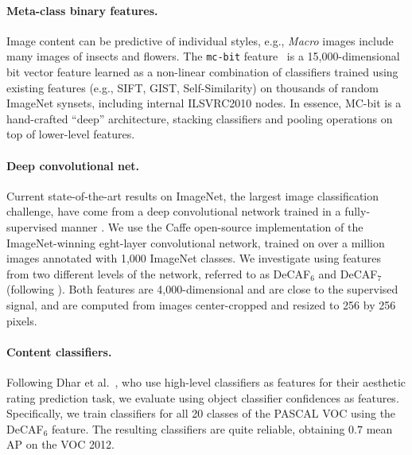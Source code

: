\vspace{-0.5em}
\paragraph{Meta-class binary features.}
Image content can be predictive of individual styles, e.g., \emph{Macro} images include many images of insects and flowers. The \texttt{mc-bit} feature~\cite{Bergamo-CVPR-2012} is a 15,000-dimensional bit vector feature learned as a non-linear combination of classifiers trained using existing features (e.g., SIFT, GIST, Self-Similarity) on thousands of random ImageNet synsets, including internal ILSVRC2010 nodes.
In essence, MC-bit is a hand-crafted ``deep'' architecture, stacking classifiers and pooling operations on top of lower-level features.

\vspace{-0.5em}
\paragraph{Deep convolutional net.}
Current state-of-the-art results on ImageNet, the largest image classification challenge, have come from a deep convolutional network trained in a fully-supervised manner \cite{krizhevsky2012imagenet}.
We use the Caffe \cite{Jia13caffe} open-source implementation of the ImageNet-winning eght-layer convolutional network, trained on over a million images annotated with 1,000 ImageNet classes.
We investigate using features from two different levels of the network, referred to as DeCAF$_6$ and DeCAF$_7$ (following \cite{Donahue2013}).
Both features are 4,000-dimensional and are close to the supervised signal, and are computed from images center-cropped and resized to 256 by 256 pixels.

\vspace{-0.5em}
\paragraph{Content classifiers.}
Following Dhar et al.~\cite{Dhar-CVPR-2011}, who use high-level classifiers as features for their aesthetic rating prediction task, we evaluate using object classifier confidences as features.
Specifically, we train classifiers for all 20 classes of the PASCAL VOC \cite{pascal-voc-2010} using the DeCAF$_6$ feature.
The resulting classifiers are quite reliable, obtaining $0.7$ mean AP on the VOC 2012.

